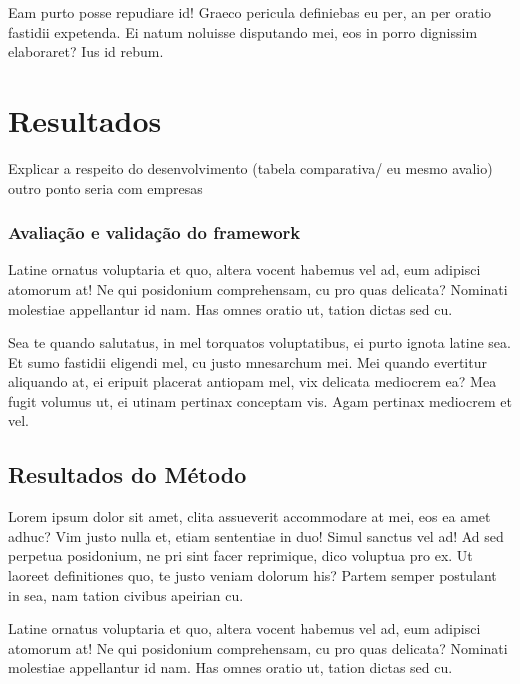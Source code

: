 \documentclass[
	12pt,				%
	openright,			%
	oneside,			%
	a4paper,			%
	english,			%
	french,				%
	spanish,			%
	brazil,				%
	]{abntex2}
\begin{document}
Eam purto posse repudiare id! Graeco pericula definiebas eu per, an per oratio fastidii expetenda. Ei natum noluisse disputando mei, eos in porro dignissim elaboraret? Ius id rebum.


\chapter{Resultados}
\label{ch: resultados} 

Explicar a respeito do desenvolvimento (tabela comparativa/ eu mesmo avalio)
outro ponto seria com empresas

\subsection{Avaliação e validação do framework}

Latine ornatus voluptaria et quo, altera vocent habemus vel ad, eum adipisci atomorum at! Ne qui posidonium comprehensam, cu pro quas delicata? Nominati molestiae appellantur id nam. Has omnes oratio ut, tation dictas sed cu.

Sea te quando salutatus, in mel torquatos voluptatibus, ei purto ignota latine sea. Et sumo fastidii eligendi mel, cu justo mnesarchum mei. Mei quando evertitur aliquando at, ei eripuit placerat antiopam mel, vix delicata mediocrem ea? Mea fugit volumus ut, ei utinam pertinax conceptam vis. Agam pertinax mediocrem et vel.


 
\section{Resultados do Método}
\label{sec: resultados}

Lorem ipsum dolor sit amet, clita assueverit accommodare at mei, eos ea amet adhuc? Vim justo nulla et, etiam sententiae in duo! Simul sanctus vel ad! Ad sed perpetua posidonium, ne pri sint facer reprimique, dico voluptua pro ex. Ut laoreet definitiones quo, te justo veniam dolorum his? Partem semper postulant in sea, nam tation civibus apeirian cu.

Latine ornatus voluptaria et quo, altera vocent habemus vel ad, eum adipisci atomorum at! Ne qui posidonium comprehensam, cu pro quas delicata? Nominati molestiae appellantur id nam. Has omnes oratio ut, tation dictas sed cu.
\end{document}
